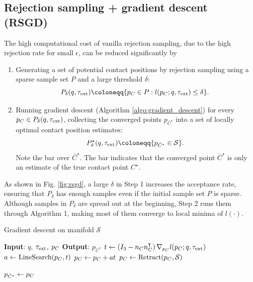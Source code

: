 \subsection{Rejection sampling + gradient descent (RSGD)\label{sec:proposed_contact_estimator}}
The high computational cost of vanilla rejection sampling, due to the high rejection rate for small $\epsilon$, can be reduced significantly by
\begin{enumerate}
\item  Generating a set of potential contact positions by rejection sampling using a sparse sample set $P$ and a large threshold $\delta$: 
\begin{equation}
P_{\delta}(q, \tauE) \coloneqq \{\pCbar \in P : l(\pCbar; q, \tauE) \leq \delta\}.
\end{equation}

\item  Running gradient descent (Algorithm \ref{algo:gradient_descent}) for every $p_{C} \in P_{\delta}(q, \tau_{\text{ext}})$, collecting the converged points $p_{\bar{C}^\star}$ into a set of locally optimal contact position estimates: 
\begin{equation}
P^\star_{\delta}(q, \tauE) \coloneqq \{p_{\bar{C}^\star} \in \mathcal{S}\}. 
\end{equation}
Note the bar over $\bar{C}^\star$. The bar indicates that the converged point $\bar{C}^\star$ is only an estimate of the true contact point $C^\star$.
\end{enumerate}

As shown in Fig. \ref{fig:rsgd}, a large $\delta$ in Step 1 increases the acceptance rate, ensuring that $P_{\delta}$ has enough samples even if the initial sample set $P$ is sparse. Although samples in $P_{\delta}$ are spread out at the beginning, Step 2 runs them through Algorithm 1, making most of them converge to local minima of $l(\cdot)$.
\begin{algorithm}[h]
\caption{Gradient descent on manifold $\mathcal{S}$}\label{algo:gradient_descent}
\textbf{Input}: ${q}$, $\tau_{\text{ext}}$, $p_{C}$\; 
\textbf{Output}: $p_{\bar{C}^\star}$\;
 {
    ${t} \gets \left({I}_3 - {n}_C {n}_C^\intercal \right)\nabla_{p_{C}} l(p_{C}; q, \tau_{\text{ext}})$ \label{algo:gradient_descent:gradient_projection}\;
    $a \gets \mathrm{LineSearch}(p_{C}, {t})$ \label{algo:gradient_descent:line_search}\;
    $p_{C} \gets p_{C} + a {t}$\;
    $p_{C} \gets \mathrm{Retract}(p_{C}, \mathcal{S})$ \label{algo:gradient_descent:retract}\;
}

$p_{\bar{C}^\star} \gets p_{C}$\;
\end{algorithm}

